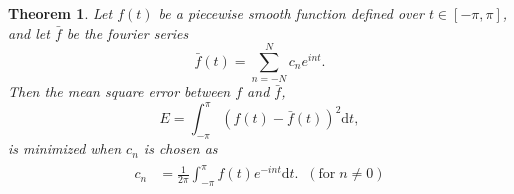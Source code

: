 \documentclass[10pt]{article}
\newtheorem{theorem}{Theorem}
\begin{document}
\begin{theorem}\label{thm:fourer_series_coeffs}
    Let \(f(t)\) be a piecewise smooth function defined over \(t \in [-\pi, \pi]\), and let \(\bar{f}\) be the fourier series \begin{equation*}
        \bar{f}(t) = \sum_{n=-N}^{N} c_ne^{int}.
    \end{equation*} Then the mean square error between \(f\) and \(\bar{f}\), \begin{equation*}
        E = \int_{-\pi}^\pi \left(f(t) - \bar{f}(t)\right)^2 \mathrm{d}t,
    \end{equation*} is minimized when \(c_n\) is chosen as \begin{align}\label{eq:fourier_trig_series_coefficients}
    \begin{split}
    c_n &= \frac{1}{2\pi} \int_{-\pi}^{\pi} f(t)e^{-int} \mathrm{d}t.\;\;(\mathrm{for}\;n \neq 0) \\
    \end{split}
\end{align}
\end{theorem}
\end{document}
